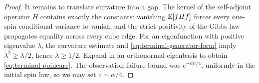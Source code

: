 \begin{proof}
It remains to translate curvature into a gap. The kernel of the
self-adjoint operator $H$ contains exactly the constants: vanishing
$\mathbb E[fHf]$ forces every one-spin conditional variance to vanish, and the
strict positivity of the Gibbs law propagates equality across every
cube edge. For an eigenfunction with positive eigenvalue $\lambda$,
the curvature estimate and \eqref{eq:terminal-generator-form} imply
$\lambda^2\ge\lambda/2$, hence $\lambda\ge1/2$. Expand in an
orthonormal eigenbasis to obtain \eqref{eq:terminal-poincare}.
The observation failure bound was $e^{-\alpha n/4}$, uniformly in the
initial spin law, so we may set $c=\alpha/4$.
\end{proof}
